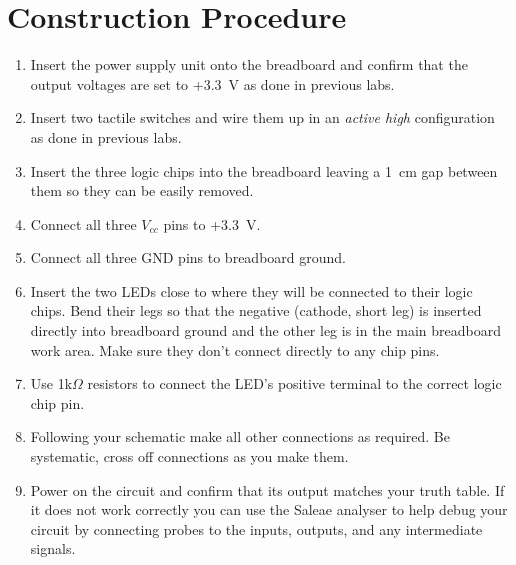 \documentclass{UoNMCHA}
\numberwithin{equation}{section}
\begin{document}
\section{Construction Procedure}
\begin{enumerate}
    \item Insert the power supply unit onto the breadboard and confirm that the output voltages are set to +3.3~V as done in previous labs.
    \item Insert two tactile switches and wire them up in an \textit{active high} configuration as done in previous labs.
    \item Insert the three logic chips into the breadboard leaving a 1~cm gap between them so they can be easily removed.
    \item Connect all three $V_{cc}$ pins to +3.3~V.
    \item Connect all three GND pins to breadboard ground.
    \item Insert the two LEDs close to where they will be connected to their logic chips. Bend their legs so that the negative (cathode, short leg) is inserted directly into breadboard ground and the other leg is in the main breadboard work area. Make sure they don't connect directly to any chip pins.
    \item Use 1k$\Omega$ resistors to connect the LED's positive terminal to the correct logic chip pin.
    \item Following your schematic make all other connections as required. Be systematic, cross off connections as you make them.
    \item Power on the circuit and confirm that its output matches your truth table. If it does not work correctly you can use the Saleae analyser to help debug your circuit by connecting probes to the inputs, outputs, and any intermediate signals.
\end{enumerate}
\end{document}
